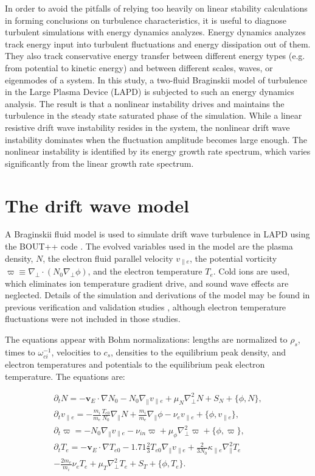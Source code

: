 \documentclass[showpacs,preprintnumbers,amsmath,amssymb,superscriptaddress]{revtex4}
\def\beqar{\begin{eqnarray}}
\def\eeqar{\end{eqnarray}}
\newcommand{\pdt}{\partial_t}
\def\grad{\nabla}
\newcommand{\gradpar}{\grad_\parallel}
\newcommand{\gradperp}{\grad_\perp}
\newcommand{\vpe}{v_{\parallel e}}
\newcommand{\nue}{\nu_{e}}
\newcommand{\nuin}{\nu_{in}}
\newcommand{\kpe}{\kappa_{\parallel e}}
\newcommand{\fmie}{\frac{m_i}{m_e}}
\begin{document}
In order to avoid the pitfalls of relying too heavily on linear stability calculations in forming conclusions on turbulence characteristics, it is useful to diagnose turbulent simulations
with energy dynamics analyzes. Energy dynamics analyzes track energy input into turbulent fluctuations and energy dissipation out of them. They also track conservative energy transfer
between different energy types (e.g. from potential to kinetic energy) and between different scales, waves, or eigenmodes of a system. In this study, a 
two-fluid Braginskii model of turbulence in the Large Plasma Device (LAPD) is subjected to such an energy dynamics analysis. The result is that a nonlinear instability drives and maintains
the turbulence in the steady state saturated phase of the simulation. While a linear resistive drift wave instability resides in the system, the nonlinear drift wave instability dominates
when the fluctuation amplitude becomes large enough. The nonlinear instability is identified by its energy growth rate spectrum, which varies significantly from the linear growth rate spectrum.


\section{The drift wave model}
\label{dw_model}

A Braginskii fluid model \cite{Braginskii1965} is used to simulate drift wave turbulence in LAPD using the BOUT++ code \cite{dudson2009}. 
The evolved variables used in the model are the plasma density, $N$, the electron fluid parallel velocity $\vpe$, the potential vorticity $\varpi \equiv \gradperp \cdot (N_0 \gradperp \phi)$,
and the electron temperature $T_e$. Cold ions are used, which eliminates ion temperature gradient drive, and sound wave effects are neglected. Details of the simulation and derivations of the model
may be found in previous verification and validation studies \cite{Popovich2010a,Popovich2010b,Umansky2011,friedman2012}, although electron temperature fluctuations were not included in those studies.

The equations appear with Bohm normalizations: lengths are normalized to $\rho_s$, times to $\omega_{ci}^{-1}$, velocities to $c_s$, densities to the equilibrium peak density, and electron
temperatures and potentials to the equilibrium peak electron temperature. The equations are:

\beqar
\label{ni_eq}
\pdt N = - {\mathbf v_E} \cdot \grad N_0 - N_0 \gradpar \vpe + \mu_N \gradperp^2 N + S_N + \{\phi,N\}, \\
\label{ve_eq}
\pdt \vpe = - \fmie \frac{T_{e0}}{N_0} \gradpar N + \fmie \gradpar \phi - \nue \vpe + \{\phi,\vpe \}, \\
\label{rho_eq}
\pdt \varpi = - N_0 \gradpar \vpe  - \nuin \varpi + \mu_\phi \gradperp^2 \varpi + \{\phi,\varpi \}, \\
\label{te_eq}
\pdt T_e = - {\mathbf v_E} \cdot \grad T_{e0} - 1.71 \frac{2}{3} T_{e0} \gradpar \vpe + \frac{2}{3 N_0} \kpe \gradpar^2 T_e  \nonumber \\
- \frac{2 m_e}{m_i} \nue T_e  + \mu_T \gradperp^2 T_e +  S_T + \{\phi,T_e\}.
\eeqar
\end{document}
